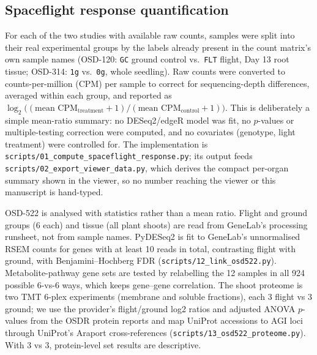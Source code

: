 \subsection{Spaceflight response quantification}
For each of the two studies with available raw counts, samples were split into their real
experimental groups by the labels already present in the count matrix's own sample names
(OSD-120: \texttt{GC} ground control vs.\ \texttt{FLT} flight, Day 13 root tissue; OSD-314:
\texttt{1g} vs.\ \texttt{0g}, whole seedling). Raw counts were converted to counts-per-million
(CPM) per sample to correct for sequencing-depth differences, averaged within each group,
and reported as $\log_2\!\big((\text{mean CPM}_{\text{treatment}}+1)/(\text{mean
CPM}_{\text{control}}+1)\big)$. This is deliberately a simple mean-ratio summary: no
DESeq2/edgeR model was fit, no $p$-values or multiple-testing correction were computed, and
no covariates (genotype, light treatment) were controlled for. The implementation is
\texttt{scripts/01\_compute\_spaceflight\_response.py}; its output feeds
\texttt{scripts/02\_export\_viewer\_data.py}, which derives the compact per-organ summary
shown in the viewer, so no number reaching the viewer or this manuscript is hand-typed.

OSD-522 is analysed with statistics rather than a mean ratio. Flight and ground groups (6
each) and tissue (all plant shoots) are read from GeneLab's processing runsheet, not from
sample names. PyDESeq2 is fit to GeneLab's unnormalised RSEM counts for genes with at least
10 reads in total, contrasting flight with ground, with Benjamini--Hochberg FDR
(\texttt{scripts/12\_link\_osd522.py}). Metabolite-pathway gene sets are tested by relabelling
the 12 samples in all 924 possible 6-vs-6 ways, which keeps gene--gene correlation. The shoot
proteome is two TMT 6-plex experiments (membrane and soluble fractions), each 3 flight vs 3
ground; we use the provider's flight/ground log2 ratios and adjusted ANOVA $p$-values from the
OSDR protein reports and map UniProt accessions to AGI loci through UniProt's Araport
cross-references (\texttt{scripts/13\_osd522\_proteome.py}). With 3 vs 3, protein-level set
results are descriptive.

